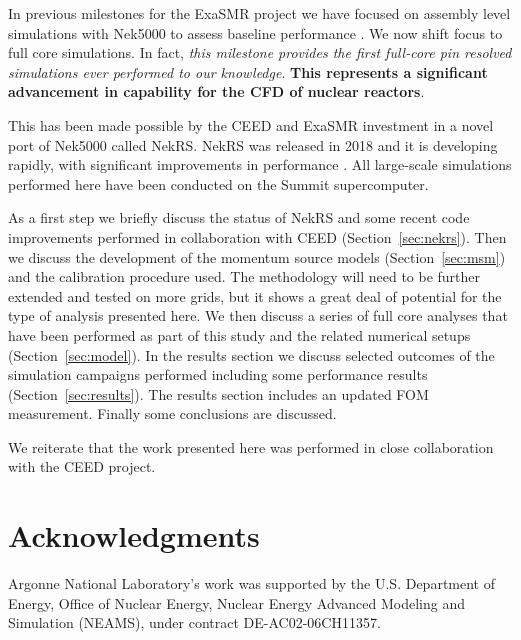 \documentclass[11pt,letterpaper]{report}
\begin{document}
In previous milestones for the ExaSMR project we have focused on assembly level simulations with Nek5000 to assess baseline performance \cite{merzari2018performance} \cite{merzari2020wall}. We now shift focus to full core simulations. In fact, \textit{this milestone provides the first full-core pin resolved simulations ever performed to our knowledge}. \textbf{This represents a significant advancement in capability for the CFD of nuclear reactors}.

This has been made possible by the CEED and ExaSMR investment in a novel port of Nek5000 called NekRS. NekRS was released in 2018 and it is developing rapidly, with significant improvements in performance \cite{merzari2020toward}. All large-scale simulations performed here have been conducted on the Summit supercomputer.

As a first step we briefly discuss the status of NekRS and some recent code improvements performed in collaboration with CEED (Section~\ref{sec:nekrs}).   Then we discuss the development of the momentum source models (Section~\ref{sec:msm}) and the calibration procedure used. The methodology will need to be further extended and tested on more grids, but it shows a great deal of potential for the type of analysis presented here. We then discuss a series of full core analyses that have been performed as part of this study and the related numerical setups (Section~\ref{sec:model}). In the results section we discuss selected outcomes of the simulation campaigns performed including some performance results (Section~\ref{sec:results}). The results section includes an updated FOM measurement. Finally some conclusions are discussed.

We reiterate  that the work presented here was performed in close collaboration with the CEED project.









\section*{Acknowledgments}

Argonne National Laboratory's work was supported by the U.S. Department of Energy, Office of Nuclear Energy, Nuclear Energy Advanced Modeling and Simulation (NEAMS), under contract DE-AC02-06CH11357.
\end{document}
